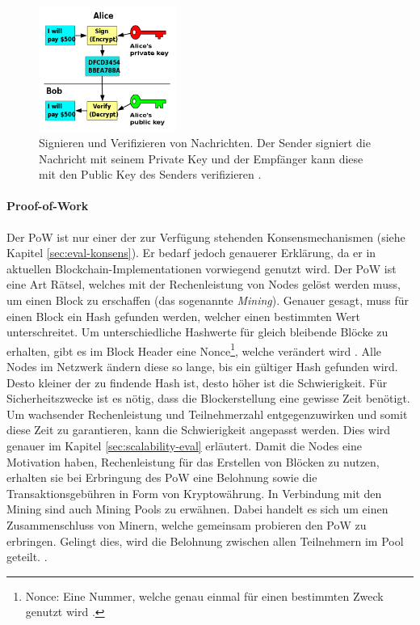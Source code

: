 \begin{figure}[!htbp]
	\centering
	  \includegraphics[width=0.4\textwidth,angle=0]{images/key-signing}
	  \caption{Signieren und Verifizieren von Nachrichten. Der Sender signiert die Nachricht mit seinem Private Key und der Empfänger kann diese mit den Public Key des Senders verifizieren \cite{WikimediaCommonsPublickeysigning2006}.}
	  \label{fig:key-signing}
\end{figure}
	
\paragraph{Proof-of-Work}
Der \acs{PoW} ist nur einer der zur Verfügung stehenden Konsensmechanismen (siehe Kapitel \ref{sec:eval-konsens}). Er bedarf jedoch genauerer Erklärung, da er in aktuellen Blockchain-Implementationen vorwiegend genutzt wird. Der \acs{PoW} ist eine Art Rätsel, welches mit der Rechenleistung von Nodes gelöst werden muss, um einen Block zu erschaffen (das sogenannte \textit{Mining}). Genauer gesagt, muss für einen Block ein Hash gefunden werden, welcher einen bestimmten Wert unterschreitet. Um unterschiedliche Hashwerte für gleich bleibende Blöcke zu erhalten, gibt es im Block Header eine Nonce\footnote{Nonce: Eine Nummer, welche genau einmal für einen bestimmten Zweck genutzt wird \cite{MargaretNonceDefinition}.}, welche verändert wird \cite{NakamotoBitcoinPeertoPeerElectronic2008}. Alle Nodes im Netzwerk ändern diese so lange, bis ein gültiger Hash gefunden wird. Desto kleiner der zu findende Hash ist, desto höher ist die Schwierigkeit. Für Sicherheitszwecke ist es nötig, dass die Blockerstellung eine gewisse Zeit benötigt. Um wachsender Rechenleistung und Teilnehmerzahl entgegenzuwirken und somit diese Zeit zu garantieren, kann die Schwierigkeit angepasst werden. Dies wird genauer im Kapitel \ref{sec:scalability-eval} erläutert. Damit die Nodes eine Motivation haben, Rechenleistung für das Erstellen von Blöcken zu nutzen, erhalten sie bei Erbringung des \acs{PoW} eine Belohnung sowie die Transaktionsgebühren in Form von Kryptowährung. In Verbindung mit den Mining sind auch Mining Pools zu erwähnen. Dabei handelt es sich um einen Zusammenschluss von Minern, welche gemeinsam probieren den \acs{PoW} zu erbringen. Gelingt dies, wird die Belohnung zwischen allen Teilnehmern im Pool geteilt.  \cite{NakamotoBitcoinPeertoPeerElectronic2008} \cite{EthereumTeamEthereumWhitePaper2017}. 

